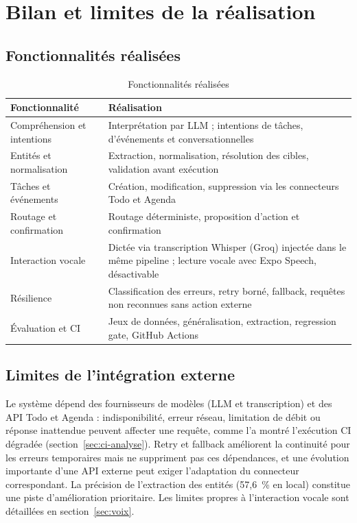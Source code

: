 \documentclass[11pt,a4paper,openany,oneside]{report}
\begin{document}
\section{Bilan et limites de la réalisation}
\subsection{Fonctionnalités réalisées}
\begin{table}[htbp]
\centering\small
\caption{Fonctionnalités réalisées}\label{tab:realise}
\begin{tabularx}{\textwidth}{@{}p{4.4cm}X@{}}
\toprule
\textbf{Fonctionnalité} & \textbf{Réalisation} \\
\midrule
Compréhension et intentions & Interprétation par LLM ; intentions de tâches, d'événements et conversationnelles \\
Entités et normalisation & Extraction, normalisation, résolution des cibles, validation avant exécution \\
Tâches et événements & Création, modification, suppression via les connecteurs Todo et Agenda \\
Routage et confirmation & Routage déterministe, proposition d'action et confirmation \\
Interaction vocale & Dictée via transcription Whisper (Groq) injectée dans le même pipeline ; lecture vocale avec Expo Speech, désactivable \\
Résilience & Classification des erreurs, retry borné, fallback, requêtes non reconnues sans action externe \\
Évaluation et CI & Jeux de données, généralisation, extraction, regression gate, GitHub Actions \\
\bottomrule
\end{tabularx}
\end{table}

\subsection{Limites de l'intégration externe}
Le système dépend des fournisseurs de modèles (LLM et transcription) et des API Todo et Agenda : indisponibilité, erreur réseau, limitation de débit ou réponse inattendue peuvent affecter une requête, comme l'a montré l'exécution CI dégradée (section~\ref{sec:ci-analyse}). Retry et fallback améliorent la continuité pour les erreurs temporaires mais ne suppriment pas ces dépendances, et une évolution importante d'une API externe peut exiger l'adaptation du connecteur correspondant. La précision de l'extraction des entités (57,6~\% en local) constitue une piste d'amélioration prioritaire. Les limites propres à l'interaction vocale sont détaillées en section~\ref{sec:voix}.
\end{document}
